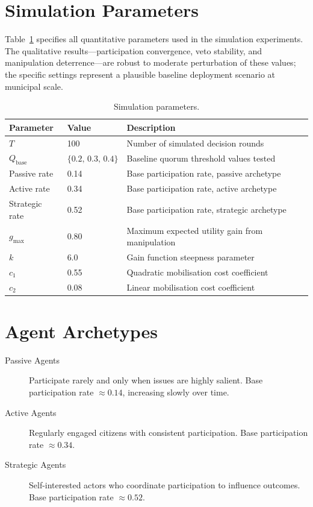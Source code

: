 \documentclass[12pt,a4paper,oneside]{report}
\begin{document}
\section{Simulation Parameters}

Table~\ref{tab:simparams} specifies all quantitative parameters used in the simulation experiments. The qualitative results---participation convergence, veto stability, and manipulation deterrence---are robust to moderate perturbation of these values; the specific settings represent a plausible baseline deployment scenario at municipal scale.

\begin{table}[htbp]
\centering
\caption{Simulation parameters.}
\label{tab:simparams}
\begin{tabular}{@{} l l p{6.5cm} @{}}
\toprule
\textbf{Parameter} & \textbf{Value} & \textbf{Description} \\
\midrule
$T$ & 100 & Number of simulated decision rounds \\
$Q_{\text{base}}$ & $\{0.2,\,0.3,\,0.4\}$ & Baseline quorum threshold values tested \\
Passive rate & 0.14 & Base participation rate, passive archetype \\
Active rate  & 0.34 & Base participation rate, active archetype \\
Strategic rate & 0.52 & Base participation rate, strategic archetype \\
$g_{\max}$ & 0.80 & Maximum expected utility gain from manipulation \\
$k$         & 6.0  & Gain function steepness parameter \\
$c_1$       & 0.55 & Quadratic mobilisation cost coefficient \\
$c_2$       & 0.08 & Linear mobilisation cost coefficient \\
\bottomrule
\end{tabular}
\end{table}

\section{Agent Archetypes}

\begin{description}
  \item[Passive Agents] Participate rarely and only when issues are highly salient. Base participation rate $\approx 0.14$, increasing slowly over time.
  \item[Active Agents] Regularly engaged citizens with consistent participation. Base participation rate $\approx 0.34$.
  \item[Strategic Agents] Self-interested actors who coordinate participation to influence outcomes. Base participation rate $\approx 0.52$.
\end{description}
\end{document}

